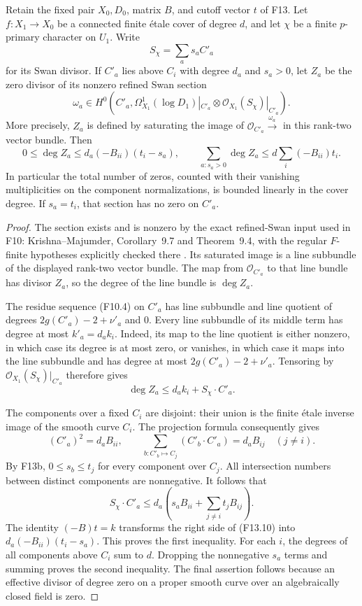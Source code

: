 \begin{proposition}
Retain the fixed pair $X_0,D_0$, matrix $B$, and cutoff vector $t$
of F13. Let $f:X_1\to X_0$ be a connected finite \'etale cover
of degree $d$, and let $\chi$ be a finite $p$-primary character
on $U_1$. Write
\[
 S_\chi=\sum_a s_aC'_a
\]
for its Swan divisor. If $C'_a$ lies above $C_i$ with degree $d_a$
and $s_a>0$, let $Z_a$ be the zero divisor of its nonzero refined
Swan section
\[
 \omega_a\in H^0\!\left(C'_a,
 \Omega^1_{X_1}(\log D_1)|_{C'_a}
                  \otimes\mathcal O_{X_1}(S_\chi)|_{C'_a}\right).
\]
More precisely, $Z_a$ is defined by saturating the image of
$\mathcal O_{C'_a}\xrightarrow{\omega_a}$ in this rank-two
vector bundle. Then
\[
 0\leq\deg Z_a\leq d_a(-B_{ii})(t_i-s_a),\qquad
 \sum_{a:s_a>0}\deg Z_a
       \leq d\sum_i(-B_{ii})t_i.
 \tag{F13.9}
\]
In particular the total number of zeros, counted with their
vanishing multiplicities on the component normalizations, is
bounded linearly in the cover degree. If $s_a=t_i$, that section
has no zero on $C'_a$.
\end{proposition}
\begin{proof}
The section exists and is nonzero by the exact refined-Swan
input used in F10: Krishna--Majumder, Corollary~9.7 and
Theorem~9.4, with the regular $F$-finite hypotheses explicitly
checked there \cite{KrishnaMajumder2026}. Its saturated image
is a line subbundle of the displayed rank-two vector bundle.
The map from $\mathcal O_{C'_a}$ to that line bundle has divisor
$Z_a$, so the degree of the line bundle is $\deg Z_a$.

The residue sequence (F10.4) on $C'_a$ has line subbundle and
line quotient of degrees $2g(C'_a)-2+\nu'_a$ and $0$.
Every line subbundle of its middle term has degree at most
$k'_a=d_a k_i$. Indeed, its map to the line quotient is either
nonzero, in which case its degree is at most zero, or vanishes,
in which case it maps into the line subbundle and has degree at
most $2g(C'_a)-2+\nu'_a$. Tensoring by
$\mathcal O_{X_1}(S_\chi)|_{C'_a}$ therefore gives
\[
                 \deg Z_a\leq d_a k_i+S_\chi\cdot C'_a.
 \tag{F13.10}
\]

The components over a fixed $C_i$ are disjoint: their union is
the finite \'etale inverse image of the smooth curve $C_i$.
The projection formula consequently gives
\[
 (C'_a)^2=d_aB_{ii},\qquad
 \sum_{b:C'_b\mapsto C_j}(C'_b\cdot C'_a)=d_aB_{ij}
                     \quad(j\ne i).
\]
By F13b, $0\leq s_b\leq t_j$ for every component over $C_j$.
All intersection numbers between distinct components are
nonnegative. It follows that
\[
 S_\chi\cdot C'_a
 \leq d_a\left(s_aB_{ii}+\sum_{j\ne i}t_jB_{ij}\right).
\]
The identity $(-B)t=k$ transforms the right side of (F13.10)
into $d_a(-B_{ii})(t_i-s_a)$. This proves the first inequality.
For each $i$, the degrees of all components above $C_i$ sum to
$d$. Dropping the nonnegative $s_a$ terms and summing proves
the second inequality. The final assertion follows because an
effective divisor of degree zero on a proper smooth curve over
an algebraically closed field is zero.
\end{proof}

